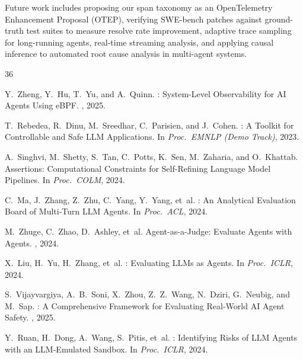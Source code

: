 \documentclass[sigplan,10pt,screen]{acmart}
\begin{document}
Future work includes proposing our span taxonomy as an OpenTelemetry
Enhancement Proposal (OTEP), verifying SWE-bench patches against ground-truth test suites to measure resolve rate improvement, adaptive trace sampling for long-running
agents, real-time streaming analysis, and applying causal inference to
automated root cause analysis in multi-agent systems.


\begin{thebibliography}{36}

Y.~Zheng, Y.~Hu, T.~Yu, and A.~Quinn.
: System-Level Observability for {AI} Agents Using {eBPF}.
, 2025.

T.~Rebedea, R.~Dinu, M.~Sreedhar, C.~Parisien, and J.~Cohen.
: A Toolkit for Controllable and Safe {LLM}
  Applications.
\newblock In {\em Proc.\ EMNLP (Demo Track)}, 2023.

A.~Singhvi, M.~Shetty, S.~Tan, C.~Potts, K.~Sen, M.~Zaharia, and O.~Khattab.
 Assertions: Computational Constraints for Self-Refining
  Language Model Pipelines.
\newblock In {\em Proc.\ COLM}, 2024.

C.~Ma, J.~Zhang, Z.~Zhu, C.~Yang, Y.~Yang, et~al.
: An Analytical Evaluation Board of Multi-Turn {LLM}
  Agents.
\newblock In {\em Proc.\ ACL}, 2024.

M.~Zhuge, C.~Zhao, D.~Ashley, et~al.
\newblock Agent-as-a-Judge: Evaluate Agents with Agents.
, 2024.

X.~Liu, H.~Yu, H.~Zhang, et~al.
: Evaluating {LLMs} as Agents.
\newblock In {\em Proc.\ ICLR}, 2024.

S.~Vijayvargiya, A.~B.~Soni, X.~Zhou, Z.~Z.~Wang, N.~Dziri, G.~Neubig, and
  M.~Sap.
: A Comprehensive Framework for Evaluating
  Real-World {AI} Agent Safety.
, 2025.

Y.~Ruan, H.~Dong, A.~Wang, S.~Pitis, et~al.
: Identifying Risks of {LLM} Agents with an {LLM}-Emulated
  Sandbox.
\newblock In {\em Proc.\ ICLR}, 2024.


\end{thebibliography}
\end{document}
